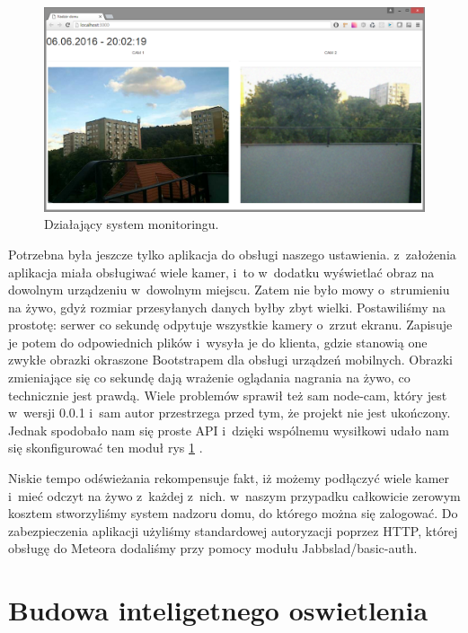 \documentclass{xmgr}
\begin{document}
\begin{figure}[h]
\centering
\includegraphics[width=12cm]{m_cam}
\caption{Działający system monitoringu.}
\label{fig:cam}
\end{figure} 
	Potrzebna była jeszcze tylko aplikacja do obsługi naszego ustawienia. z~założenia aplikacja miała obsługiwać wiele kamer, i~to w~dodatku wyświetlać obraz na dowolnym urządzeniu w~dowolnym miejscu. Zatem nie było mowy o~strumieniu na żywo, gdyż rozmiar przesyłanych danych byłby zbyt wielki. Postawiliśmy na prostotę: serwer co sekundę odpytuje wszystkie kamery o~zrzut ekranu. Zapisuje je potem do odpowiednich plików i~wysyła je do klienta, gdzie stanowią one zwykłe obrazki okraszone Bootstrapem dla obsługi urządzeń mobilnych. Obrazki zmieniające się co sekundę dają wrażenie oglądania nagrania na żywo, co technicznie jest prawdą.
	Wiele problemów sprawił też sam node-cam, który jest w~wersji 0.0.1 i~sam autor przestrzega przed tym, że projekt nie jest ukończony. Jednak spodobało nam się proste API i~dzięki wspólnemu wysiłkowi udało nam się skonfigurować ten moduł rys \ref{fig:cam} . 

	Niskie tempo odświeżania rekompensuje fakt, iż możemy podłączyć wiele kamer i~mieć odczyt na żywo z~każdej z~nich. w~naszym przypadku całkowicie zerowym kosztem stworzyliśmy system nadzoru domu, do którego można się zalogować. Do zabezpieczenia aplikacji użyliśmy standardowej autoryzacji poprzez HTTP, której obsługę do Meteora dodaliśmy przy pomocy modułu Jabbslad/basic-auth.

\section{Budowa inteligetnego oswietlenia}
\end{document}
